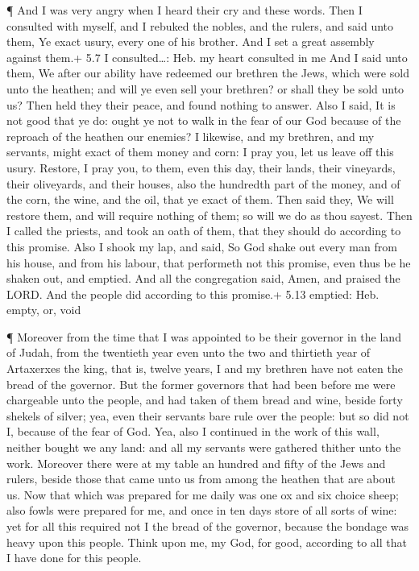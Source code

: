  ¶ And I was very angry when I heard their cry and these
words.  Then I consulted with myself, and I rebuked the
nobles, and the rulers, and said unto them, Ye exact usury, every one of
his brother. And I set a great assembly against them.+ 5.7 I
consulted\ldots: Heb. my heart consulted in me  And I said
unto them, We after our ability have redeemed our brethren the Jews,
which were sold unto the heathen; and will ye even sell your brethren?
or shall they be sold unto us? Then held they their peace, and found
nothing to answer.  Also I said, It is not good that ye do:
ought ye not to walk in the fear of our God because of the reproach of
the heathen our enemies?  I likewise, and my brethren, and
my servants, might exact of them money and corn: I pray you, let us
leave off this usury.  Restore, I pray you, to them, even
this day, their lands, their vineyards, their oliveyards, and their
houses, also the hundredth part of the money, and of the corn, the wine,
and the oil, that ye exact of them.  Then said they, We
will restore them, and will require nothing of them; so will we do as
thou sayest. Then I called the priests, and took an oath of them, that
they should do according to this promise.  Also I shook my
lap, and said, So God shake out every man from his house, and from his
labour, that performeth not this promise, even thus be he shaken out,
and emptied. And all the congregation said, Amen, and praised the LORD.
And the people did according to this promise.+ 5.13 emptied: Heb. empty,
or, void

 ¶ Moreover from the time that I was appointed to be their
governor in the land of Judah, from the twentieth year even unto the two
and thirtieth year of Artaxerxes the king, that is, twelve years, I and
my brethren have not eaten the bread of the governor.  But
the former governors that had been before me were chargeable unto the
people, and had taken of them bread and wine, beside forty shekels of
silver; yea, even their servants bare rule over the people: but so did
not I, because of the fear of God.  Yea, also I continued
in the work of this wall, neither bought we any land: and all my
servants were gathered thither unto the work.  Moreover
there were at my table an hundred and fifty of the Jews and rulers,
beside those that came unto us from among the heathen that are about us.
 Now that which was prepared for me daily was one ox and
six choice sheep; also fowls were prepared for me, and once in ten days
store of all sorts of wine: yet for all this required not I the bread of
the governor, because the bondage was heavy upon this people.
 Think upon me, my God, for good, according to all that I
have done for this people.

